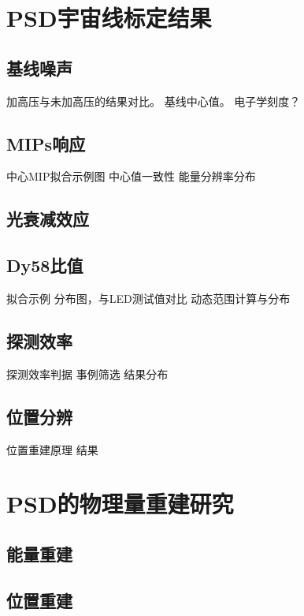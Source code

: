 
\section{PSD宇宙线标定结果}
\subsection{基线噪声}
加高压与未加高压的结果对比。
基线中心值。
电子学刻度？

\subsection{MIPs响应}
中心MIP拟合示例图
中心值一致性
能量分辨率分布

\subsection{光衰减效应}

\subsection{Dy58比值}
拟合示例
分布图，与LED测试值对比
动态范围计算与分布

\subsection{探测效率}
探测效率判据
事例筛选
结果分布

\subsection{位置分辨}
位置重建原理
结果

\section{PSD的物理量重建研究}
\subsection{能量重建}
\subsection{位置重建}